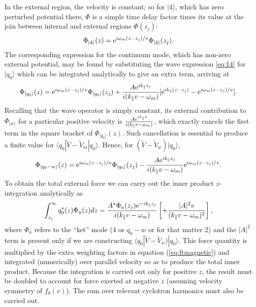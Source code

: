 \documentclass[12pt]{article}
\def\ket#1{|#1\rangle}
\def\bra#1{\langle#1}
\def\etothe#1{{\rm e}^{#1}}
\begin{document}
In the external region, the velocity is constant; so for $\ket{4}$,
which has zero perturbed potential there, $\Phi$ is a simple time
delay factor times its value at the join between internal and external
regions $\Phi(z_j)$:
\begin{equation}
  \label{phi4}
  \Phi_{\ket{4}}(z)=\etothe{i\omega_m(z-z_j)/v}   \Phi_{\ket{4}}(z_j).
\end{equation}
The corresponding expression for the continuum mode, which has
non-zero external potential, may be
found by substituting the wave expression \ref{eq:14} for  $\ket{q_0}$
which can be integrated analytically to give an extra term, arriving
at 
\begin{equation}
  \label{phiq}
  \Phi_{\ket{q_0}}(z)=\etothe{i\omega_m(z-z_j)/v}   \Phi_{\ket{q_0}}(z_j)
  +{A\etothe{ik_\parallel z_j}\over i(k_\parallel v-\omega_m)}[\etothe{ik_\parallel(z-z_j)}
  -\etothe{i\omega_m(z-z_j)/v}].
\end{equation}
Recalling that the wave operator is simply constant, its external
contribution to $\Phi_{\ket{w}}$ for a particular positive velocity is
${A\etothe{ik_\parallel z}\over i(k_\parallel v-\omega_m)}$, which
exactly cancels the first term in the square bracket of
$\Phi_{\ket{q_0}}(z)$. Such cancellation is essential to produce a
finite value for $\bra{q_0}|\tilde V -\tilde V_m\ket{q_0}$. Hence, for
$(\tilde V -\tilde V_w)\ket{q_0}$,
\begin{equation}
  \label{phidiff}
  \Phi_{\ket{q_0-w}}(z)=\etothe{i\omega_m(z-z_j)/v}   \Phi_{\ket{q_0}}(z_j)
  -{A\etothe{ik_\parallel z_j}\over i(k_\parallel v-\omega_m)}
  \etothe{i\omega_m(z-z_j)/v}.
\end{equation}
To obtain the total external force we can carry out the inner product
$z$-integration analytically as
\begin{equation}
  \label{extforce}
  \int_{z_j}^\infty q_0^*(z) \Phi_u(z)  dz =
  {A^*\Phi_u(z_j)\etothe{-ik_\parallel z_j}\over i(k_\parallel  v-\omega_m)}
  \left[+ {|A|^2v\over (k_\parallel v-\omega_m)^2}\right],
\end{equation}
where $\Phi_u$ refers to the ``ket'' mode (4 or $q_0-w$ or for that
matter 2) and the $|A|^2$ term is present only if we are constructing
$\bra{q_0}|\tilde V -\tilde V_w)\ket{q_0}$. This force quantity is
multiplied by the extra weighting factors in equation
(\ref{eq:ftmagnetic}) and integrated (numerically) over parallel
velocity so as to produce the total inner product. Because the
integration is carried out only for positive $z$, the result must be
doubled to account for force exerted at negative $z$ (assuming
velocity symmetry of $f_0(v)$). The sum over relevant cyclotron
harmonics must also be carried out.
\end{document}
